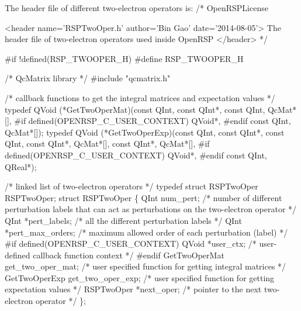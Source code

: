 The header file of different two-electron operators is:
\nwenddocs{}\endmoddef
/*
  \LA{}OpenRSPLicense~{\nwtagstyle{}}\RA{}

  <header name='RSPTwoOper.h' author='Bin Gao' date='2014-08-05'>
    The header file of two-electron operators used inside OpenRSP
  </header>
*/

#if !defined(RSP_TWOOPER_H)
#define RSP_TWOOPER_H

/* QcMatrix library */
#include "qcmatrix.h"

/* callback functions to get the integral matrices and expectation values */
typedef QVoid (*GetTwoOperMat)(const QInt,
                               const QInt*,
                               const QInt,
                               QcMat*[],
#if defined(OPENRSP_C_USER_CONTEXT)
                               QVoid*,
#endif
                               const QInt,
                               QcMat*[]);
typedef QVoid (*GetTwoOperExp)(const QInt,
                               const QInt*,
                               const QInt,
                               const QInt*,
                               QcMat*[],
                               const QInt*,
                               QcMat*[],
#if defined(OPENRSP_C_USER_CONTEXT)
                               QVoid*,
#endif
                               const QInt,
                               QReal*);

/* linked list of two-electron operators */
typedef struct RSPTwoOper RSPTwoOper;
struct RSPTwoOper \{
    QInt num_pert;                   /* number of different perturbation labels that
                                        can act as perturbations on the two-electron operator */
    QInt *pert_labels;               /* all the different perturbation labels */
    QInt *pert_max_orders;           /*  maximum allowed order of each perturbation (label) */
#if defined(OPENRSP_C_USER_CONTEXT)
    QVoid *user_ctx;                 /* user-defined callback function context */
#endif
    GetTwoOperMat get_two_oper_mat;  /* user specified function for getting integral matrices */
    GetTwoOperExp get_two_oper_exp;  /* user specified function for getting expectation values */
    RSPTwoOper *next_oper;           /* pointer to the next two-electron operator */
\};

